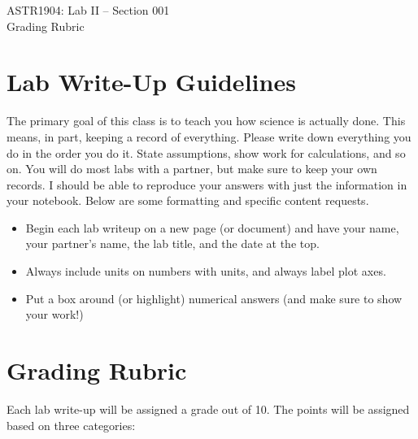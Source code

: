 \documentclass[10pt]{article}
\begin{document}
\begin{center}
\LARGE{ASTR1904: Lab II -- Section 001} \\ \medskip \Large{Grading Rubric}\\ 
\end{center}

\section*{Lab Write-Up Guidelines}

The primary goal of this class is to teach you how science is actually done. This means, in part, keeping a record of everything. Please write down everything you do in the order you do it. State assumptions, show work for calculations, and so on. You will do most labs with a partner, but make sure to keep your own records. I should be able to reproduce your answers with just the information in your notebook. Below are some formatting and specific content requests.

\begin{itemize}
\item Begin each lab writeup on a new page (or document) and have your name, your partner's name, the lab title, and the date at the top.
\item Always include units on numbers with units, and always label plot axes.
\item Put a box around (or highlight) numerical answers (and make sure to show your work!)
\end{itemize}

\section*{Grading Rubric}

Each lab write-up will be assigned a grade out of 10. The points will be assigned based on three categories:
\end{document}
